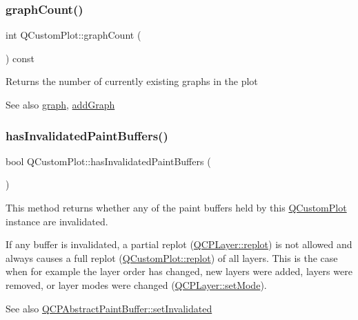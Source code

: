 \subsubsection{\texorpdfstring{graph\+Count()}{graphCount()}}
{\footnotesize\ttfamily int Q\+Custom\+Plot\+::graph\+Count (\begin{DoxyParamCaption}{ }\end{DoxyParamCaption}) const}

Returns the number of currently existing graphs in the plot

\begin{DoxySeeAlso}{See also}
\hyperlink{class_q_custom_plot_a6ecae130f684b25276fb47bd3a5875c6}{graph}, \hyperlink{class_q_custom_plot_a6fb2873d35a8a8089842d81a70a54167}{add\+Graph} 
\end{DoxySeeAlso}
\mbox{\label{class_q_custom_plot_ad452b582348c8e99462d83fe1cd0279b}} 
\subsubsection{\texorpdfstring{has\+Invalidated\+Paint\+Buffers()}{hasInvalidatedPaintBuffers()}}
{\footnotesize\ttfamily bool Q\+Custom\+Plot\+::has\+Invalidated\+Paint\+Buffers (\begin{DoxyParamCaption}{ }\end{DoxyParamCaption})\hspace{0.3cm}{\ttfamily [protected]}}

This method returns whether any of the paint buffers held by this \hyperlink{class_q_custom_plot}{Q\+Custom\+Plot} instance are invalidated.

If any buffer is invalidated, a partial replot (\hyperlink{class_q_c_p_layer_adefd53b6db02f470151c416f42e37180}{Q\+C\+P\+Layer\+::replot}) is not allowed and always causes a full replot (\hyperlink{class_q_custom_plot_aa4bfe7d70dbe67e81d877819b75ab9af}{Q\+Custom\+Plot\+::replot}) of all layers. This is the case when for example the layer order has changed, new layers were added, layers were removed, or layer modes were changed (\hyperlink{class_q_c_p_layer_a938d57b04f4e4c23cedf1711f983919b}{Q\+C\+P\+Layer\+::set\+Mode}).

\begin{DoxySeeAlso}{See also}
\hyperlink{class_q_c_p_abstract_paint_buffer_ae4c7dc70dfc66be2879ce297b2b3d67f}{Q\+C\+P\+Abstract\+Paint\+Buffer\+::set\+Invalidated} 
\end{DoxySeeAlso}
\mbox{\label{class_q_custom_plot_af0b57f35646079f93fa6161a65b36109}} 
